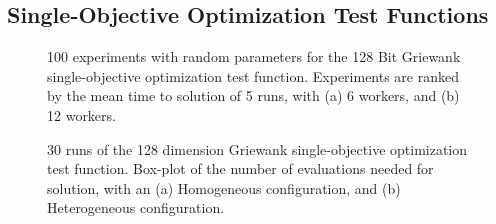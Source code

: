 \documentclass{llncs}
\begin{document}
\subsection{ Single-Objective Optimization Test Functions}

\begin{figure}[b]
    \centering

    \caption{100 experiments with random parameters for the 128 Bit Griewank 
    single-objective optimization test function. Experiments are ranked by 
    the mean time to solution of 5 runs, with (a) 6 workers, and (b) 12 workers.}
    \label{fig:griewank-homo}
\end{figure}


\begin{figure}[b]
    \centering
      \caption{30 runs of the 128 dimension Griewank single-objective optimization test function. 
    Box-plot of the number of evaluations needed for solution, with an (a) Homogeneous configuration, and (b) Heterogeneous configuration.}
    \label{fig:griewank-evals}
\end{figure}
\end{document}
